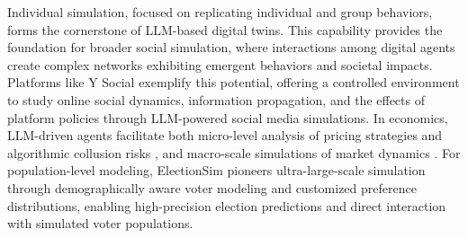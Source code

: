 

Individual simulation, focused on replicating individual and group behaviors, forms the cornerstone of LLM-based digital twins. This capability provides the foundation for broader social simulation, where interactions among digital agents create complex networks exhibiting emergent behaviors and societal impacts. Platforms like Y Social \citep{rossetti2024ysocialllmpoweredsocial} exemplify this potential, offering a controlled environment to study online social dynamics, information propagation, and the effects of platform policies through LLM-powered social media simulations.  In economics, LLM-driven agents facilitate both micro-level analysis of pricing strategies and algorithmic collusion risks \citep{fish2024algorithmiccollusionlargelanguage}, and macro-scale simulations of market dynamics \citep{gurcan2024llmaugmentedagentbasedmodellingsocial}.  For population-level modeling, ElectionSim \citep{zhang2024electionsim} pioneers ultra-large-scale simulation through demographically aware voter modeling and customized preference distributions, enabling high-precision election predictions and direct interaction with simulated voter populations.




